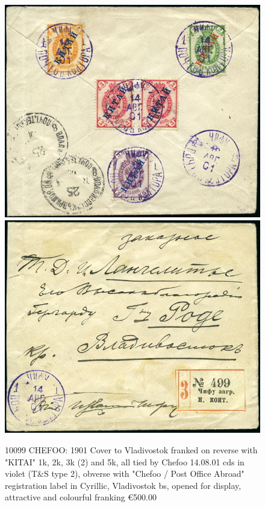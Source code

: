 \begin{figure}[htbp]
\centering
\includegraphics[width=.95\textwidth]{../russian-post-offices-in-china/10099.jpg}
\includegraphics[width=.95\textwidth]{../russian-post-offices-in-china/10099-1.jpg}
\caption{
10099	CHEFOO: 1901 Cover to Vladivostok franked on reverse with "KITAI" 1k, 
2k, 3k (2) and 5k, all tied by Chefoo 14.08.01 cds in violet (T\&S type 2), 
obverse with "Chefoo / Post Office Abroad" registration label in Cyrillic, 
Vladivostok bs, opened for display, attractive and colourful franking
\euro 500.00 
}  
\end{figure} 













  
  
  
  
  
  
  
  
  
  
  
  
  
  
  
    